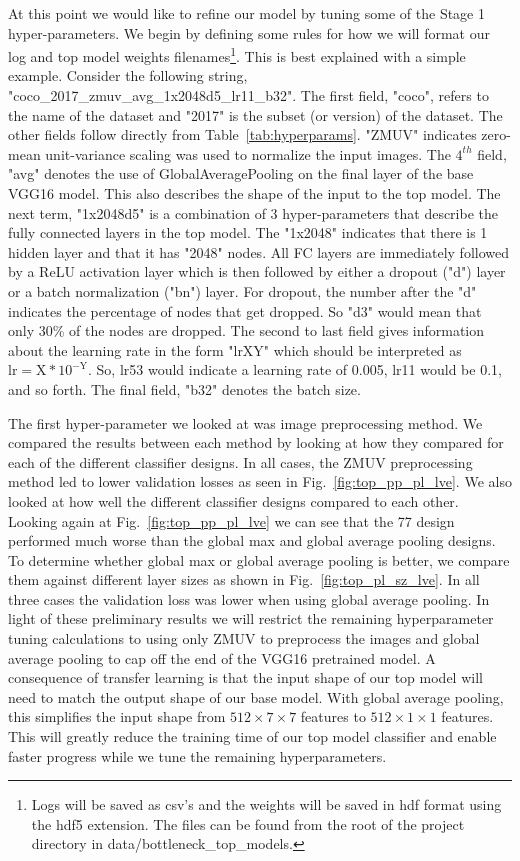 \documentclass[12pt,journal,compsoc]{IEEEtran}
\begin{document}
At this point we would like to refine our model by tuning some of the Stage 1 hyper-parameters.  We begin by defining some rules for how we will format our log and top model weights filenames\footnote{Logs will be saved as csv's and the weights will be saved in hdf format using the hdf5 extension. The files can be found from the root of the project directory in data/bottleneck\_top\_models.}. This is best explained with a simple example. Consider the following string, "coco\_2017\_zmuv\_avg\_1x2048d5\_lr11\_b32". The first field, "coco", refers to the name of the dataset and "2017" is the subset (or version) of the dataset. The other fields follow directly from Table~\ref{tab:hyperparams}. "ZMUV" indicates zero-mean unit-variance scaling was used to normalize the input images. The $4^{th}$ field, "avg" denotes the use of GlobalAveragePooling on the final layer of the base VGG16 model. This also describes the shape of the input to the top model. The next term, "1x2048d5" is a combination of 3 hyper-parameters that describe the fully connected layers in the top model. The "1x2048" indicates that there is 1 hidden layer and that it has "2048" nodes.  All FC layers are immediately followed by a ReLU activation layer which is then followed by either a dropout ("d") layer or a batch normalization ("bn") layer. For dropout, the number after the "d" indicates the percentage of nodes that get dropped. So "d3" would mean that only 30\% of the nodes are dropped. The second to last field gives information about the learning rate in the form "lrXY" which should be interpreted as $\mathrm{lr = X * 10^{-Y}}$.  So, lr53 would indicate a learning rate of 0.005, lr11 would be 0.1, and so forth. The final field, "b32" denotes the batch size.

The first hyper-parameter we looked at was image preprocessing method. We compared the results between each method by looking at how they compared for each of the different classifier designs. In all cases, the ZMUV preprocessing method led to lower validation losses as seen in Fig.~\ref{fig:top_pp_pl_lve}. We also looked at how well the different classifier designs compared to each other. Looking again at Fig.~\ref{fig:top_pp_pl_lve} we can see that the 77 design performed much worse than the global max and global average pooling designs. To determine whether global max or global average pooling is better, we compare them against different layer sizes as shown in Fig.~\ref{fig:top_pl_sz_lve}. In all three cases the validation loss was lower when using global average pooling. In light of these preliminary results we will restrict the remaining hyperparameter tuning calculations to using only ZMUV to preprocess the images and global average pooling to cap off the end of the VGG16 pretrained model. A consequence of transfer learning is that the input shape of our top model will need to match the output shape of our base model. With global average pooling, this simplifies the input shape from $512\times7\times7$ features to $512\times1\times1$ features. This will greatly reduce the training time of our top model classifier and enable faster progress while we tune the remaining hyperparameters.
\end{document}
